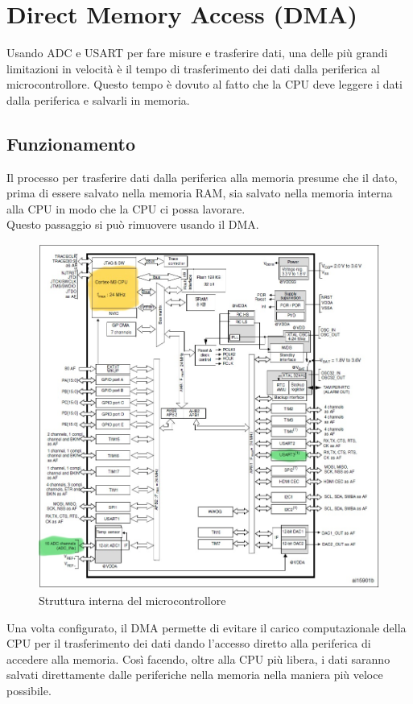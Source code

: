 \pagebreak
\section{Direct Memory Access (DMA)}
Usando ADC e USART per fare misure e trasferire dati, una delle più grandi limitazioni in velocità è il tempo di trasferimento dei dati dalla periferica al microcontrollore. Questo tempo è dovuto al fatto che la CPU deve leggere i dati dalla periferica e salvarli in memoria.\\

\subsection{Funzionamento}

Il processo per trasferire dati dalla periferica alla memoria presume che il dato, prima di essere salvato nella memoria RAM, sia salvato nella memoria interna alla CPU in modo che la CPU ci possa lavorare. \\
Questo passaggio si può rimuovere usando il DMA.

\begin{figure}[h]
    \centering
    \includegraphics[width=0.8\linewidth]{microcontrollore/assets/Cortex_structure.jpg}
    \caption{Struttura interna del microcontrollore}
    \label{fig:Cortex}
\end{figure}

Una volta configurato, il DMA permette di evitare il carico computazionale della CPU per il trasferimento dei dati dando l'accesso diretto alla periferica di accedere alla memoria.
Così facendo, oltre alla CPU più libera, i dati saranno salvati direttamente dalle periferiche nella memoria nella maniera più veloce possibile.\\

